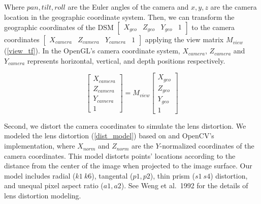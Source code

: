 \documentclass{article}
\begin{document}
Where \(pan, tilt, roll\) are the Euler angles of the camera and \(x, y, z\) are the camera location in the geographic coordinate system. Then, we can transform the geographic coordinates of the DSM \(\begin{bmatrix} X_{geo} & Z_{geo} & Y_{geo} & 1 \end{bmatrix}\) to the camera coordinates \(\begin{bmatrix} X_{camera} & Z_{camera} & Y_{camera} & 1 \end{bmatrix}\) applying the view matrix \(M_{view}\) (\ref{view_tf}). In the OpenGL's camera coordinate system, \(X_{camera}\), \(Z_{camera}\) and \(Y_{camera}\) represents horizontal, vertical, and depth positions respectively.

\label{view_tf}
\begin{equation}
  \begin{bmatrix} 
    X_{camera} \\ Z_{camera} \\ Y_{camera} \\ 1 
  \end{bmatrix}
  =
  M_{view}
  \begin{bmatrix} 
    X_{geo} \\ Z_{geo} \\ Y_{geo} \\ 1 
  \end{bmatrix}
\end{equation}

Second, we distort the camera coordinates to simulate the lens distortion. We modeled the lens distortion (\ref{dist_model}) based on \cite{Weng1992CameraCalib} and OpenCV's implementation, where \(X_{norm}\) and \(Z_{norm}\) are the \(Y\)-normalized coordinates of the camera coordinates. This model distorts points' locations according to the distance from the center of the image when projected to the image surface. Our model includes radial (\(k1~k6\)), tangental (\(p1, p2\)), thin prism (\(s1~s4\)) distortion, and unequal pixel aspect ratio (\(a1, a2\)). See Weng et al.~1992 for the details of lens distortion modeling.
\end{document}
